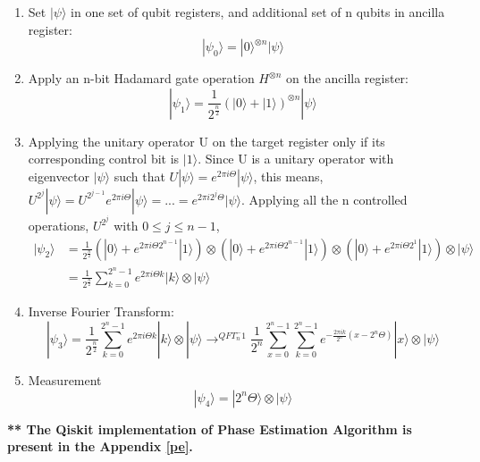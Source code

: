 \documentclass[12pt]{report}
\begin{document}
\begin{enumerate}
	\item Set $|\psi\rangle$ in one set of qubit registers, and additional set of n qubits in ancilla register:
		\begin{equation}
			|\psi_0\rangle = |0\rangle^{\otimes n}|\psi\rangle
		\end{equation} 
	\item Apply an n-bit Hadamard gate operation $H^{\otimes n}$ on the ancilla register:
		\begin{equation}
			|\psi_1\rangle = \frac{1}{2^{\frac{n}{2}}}(|0\rangle + |1\rangle)^{\otimes n}|\psi \rangle
		\end{equation} 
	\item Applying the unitary operator U on the target register only if its corresponding control bit is $|1\rangle$. Since U is a unitary operator with eigenvector $|\psi\rangle$ such that $U|\psi\rangle = e^{2\pi i\Theta}|\psi\rangle$, this means, $U^{2^j}|\psi\rangle =U^{2^{j-1}}e^{2\pi i\Theta}|\psi\rangle =...= e^{2\pi i2^j\Theta}|\psi\rangle$. Applying all the n controlled operations, $U^{2^j}$ with $0\le j\le n-1$, 
		\begin{equation}
		\begin{split}
			|\psi_2\rangle &= \frac{1}{2^{\frac{n}{2}}}(|0\rangle +  e^{2\pi i\Theta2^{n-1}}|1\rangle) \otimes (|0\rangle +  e^{2\pi i\Theta2^{n-1}}|1\rangle) \otimes (|0\rangle +  e^{2\pi i\Theta2^{1}}|1\rangle) \otimes  |\psi \rangle \\
					& = \frac{1}{2^{\frac{n}{2}}} \sum_{k=0}^{2^{n}-1} e^{2\pi i \Theta k} |k\rangle \otimes |\psi\rangle
		\end{split}
		\end{equation}
	\item Inverse Fourier Transform:
		\begin{equation}
			|\psi_3\rangle = \frac{1}{2^{\frac{n}{2}}} \sum_{k=0}^{2^{n}-1} e^{2\pi i \Theta k} |k\rangle \otimes |\psi\rangle \to^{QFT_n^-1}  \frac{1}{2^n} \sum_{x=0}^{2^{n}-1}\sum_{k=0}^{2^{n}-1} e^{-\frac{2\pi ik}{2^n}(x-2^n\Theta)} |x\rangle \otimes |\psi\rangle
		\end{equation}
	\item Measurement 
		\begin{equation}
			|\psi_4\rangle =  |2^n\Theta\rangle \otimes |\psi\rangle
		\end{equation}
\end{enumerate} 
\textbf{** The Qiskit implementation of Phase Estimation Algorithm is present in the Appendix \ref{pe}.}
\newpage
\end{document}
